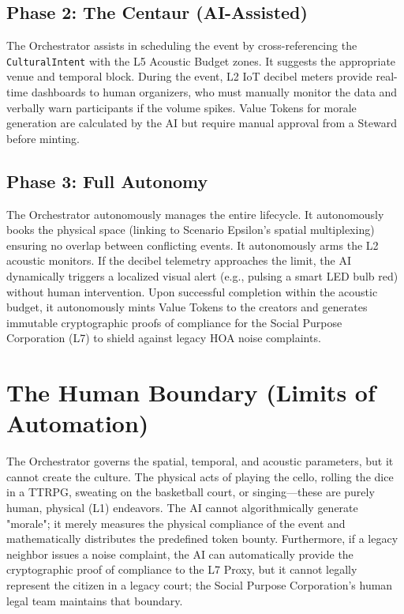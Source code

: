 \subsection{Phase 2: The Centaur (AI-Assisted)}
The Orchestrator assists in scheduling the event by cross-referencing the \texttt{CulturalIntent} with the L5 Acoustic Budget zones. It suggests the appropriate venue and temporal block. During the event, L2 IoT decibel meters provide real-time dashboards to human organizers, who must manually monitor the data and verbally warn participants if the volume spikes. Value Tokens for morale generation are calculated by the AI but require manual approval from a Steward before minting.

\subsection{Phase 3: Full Autonomy}
The Orchestrator autonomously manages the entire lifecycle. It autonomously books the physical space (linking to Scenario Epsilon's spatial multiplexing) ensuring no overlap between conflicting events. It autonomously arms the L2 acoustic monitors. If the decibel telemetry approaches the limit, the AI dynamically triggers a localized visual alert (e.g., pulsing a smart LED bulb red) without human intervention. Upon successful completion within the acoustic budget, it autonomously mints Value Tokens to the creators and generates immutable cryptographic proofs of compliance for the Social Purpose Corporation (L7) to shield against legacy HOA noise complaints.

\section{The Human Boundary (Limits of Automation)}
The Orchestrator governs the spatial, temporal, and acoustic parameters, but it cannot create the culture. The physical acts of playing the cello, rolling the dice in a TTRPG, sweating on the basketball court, or singing---these are purely human, physical (L1) endeavors. The AI cannot algorithmically generate "morale"; it merely measures the physical compliance of the event and mathematically distributes the predefined token bounty. Furthermore, if a legacy neighbor issues a noise complaint, the AI can automatically provide the cryptographic proof of compliance to the L7 Proxy, but it cannot legally represent the citizen in a legacy court; the Social Purpose Corporation's human legal team maintains that boundary.

